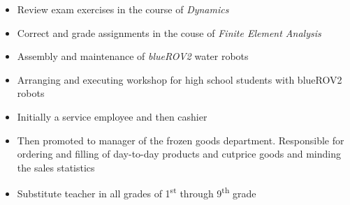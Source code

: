 \documentclass[10pt,a4paper]{altacv}
\begin{document}
\begin{itemize}
\item Review exam exercises in the course of \textit{Dynamics}
\item Correct and grade assignments in the couse of \textit{Finite Element Analysis}
\item Assembly and maintenance of \textit{blueROV2} water robots
\item Arranging and executing workshop for high school students with blueROV2 robots
\end{itemize}


\divider

\begin{itemize}
\item Initially a service employee and then cashier
\item Then promoted to manager of the frozen goods department. Responsible for ordering and ﬁlling of day-to-day products and cutprice
goods and minding the sales statistics
\end{itemize}

\divider

\begin{itemize}
\item Substitute teacher in all grades of 1\textsuperscript{st} through 9\textsuperscript{th} grade
\end{itemize}



\end{document}
